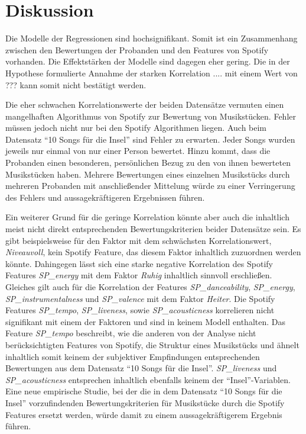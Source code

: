 \section*{Diskussion}
\label{sec:Diskussion}


Die Modelle der Regressionen sind hochsignifikant.
Somit ist ein Zusammenhang zwischen den Bewertungen der Probanden und den Features von Spotify vorhanden.
Die Effektstärken der Modelle sind dagegen eher gering.
Die in der Hypothese formulierte Annahme der starken Korrelation .... mit einem Wert von ??? kann somit nicht bestätigt werden.

Die eher schwachen Korrelationswerte der beiden Datensätze vermuten einen mangelhaften Algorithmus von Spotify zur Bewertung von Musikstücken.
Fehler müssen jedoch nicht nur bei den Spotify Algorithmen liegen.
Auch beim Datensatz ``10 Songs für die Insel'' sind Fehler zu erwarten.
Jeder Songs wurden jeweils nur einmal von nur einer Person bewertet.
Hinzu kommt, dass die Probanden einen besonderen, persönlichen Bezug zu den von ihnen bewerteten Musikstücken haben.
Mehrere Bewertungen eines einzelnen Musikstücks durch mehreren Probanden mit anschließender Mittelung würde zu einer Verringerung des Fehlers und aussagekräftigeren Ergebnissen führen.

Ein weiterer Grund für die geringe Korrelation könnte aber auch die inhaltlich meist nicht direkt entsprechenden Bewertungskriterien beider Datensätze sein.
Es gibt beispielsweise für den Faktor mit dem schwächsten Korrelationswert, \textit{Niveauvoll}, kein Spotify Feature, das diesem Faktor inhaltlich zuzuordnen werden könnte. 
Dahingegen lässt sich eine starke negative Korrelation des Spotify Features \textit{SP\_energy} mit dem Faktor \textit{Ruhig} inhaltlich sinnvoll erschließen.
Gleiches gilt auch für die Korrelation der Features \textit{SP\_danceability}, \textit{SP\_energy}, \textit{SP\_instrumentalness} und \textit{SP\_valence} mit dem Faktor \textit{Heiter}.
Die Spotify Features \textit{SP\_tempo}, \textit{SP\_liveness}, sowie \textit{SP\_acousticness} korrelieren nicht signifikant mit einem der Faktoren und sind in keinem Modell enthalten. 
Das Feature \textit{SP\_tempo} beschreibt, wie die anderen  von der Analyse nicht berücksichtigten Features von Spotify, die Struktur eines Musikstücks und ähnelt inhaltlich somit keinem der subjektiver Empfindungen entsprechenden Bewertungen aus dem Datensatz ``10 Songs für die Insel''.
\textit{SP\_liveness} und \textit{SP\_acousticness} entsprechen inhaltlich ebenfalls keinem der ``Insel''-Variablen.  
Eine neue empirische Studie, bei der die in dem Datensatz ``10 Songs für die Insel'' vorzufindenden Bewertungskriterien für Musikstücke durch die Spotify Features ersetzt werden, würde damit zu einem aussagekräftigerem Ergebnis führen.



